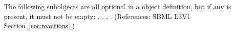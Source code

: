 The following subobjects are all optional in a \Reaction object definition,
but if any is present, it must not be empty: \ListOfReactants,
\ListOfProducts, \ListOfModifiers, \KineticLaw.  (References: SBML L3V1
Section~\ref{sec:reactions}.)
